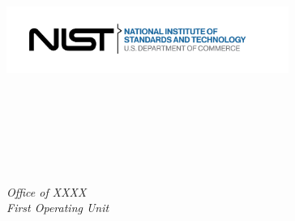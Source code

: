 \begin{titlepage}
\begin{flushright}
            \includegraphics[trim=0 0 0.7in 0,clip,width=3.62in]{Figures/Logos/NIST-logo.png}\\ 
        \end{flushright}
        
        \begin{flushright}
            \LARGE{}\\
            \LARGE{\sffamily{\textbf{\pubnumber}}}\\
            \vfill
            \Huge{\sffamily{\textbf{\pubtitle}}}\\
            \vfill
            \normalsize \authorone\\
            \authortwo\\
            \authorthree\\
            \textit{Office of XXXX}\\
            \textit{First Operating Unit}\\

\end{flushright}
\end{titlepage}
